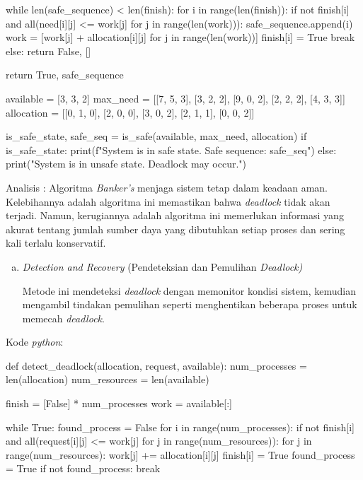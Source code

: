 \documentclass[12pt]{article}
\begin{document}
\begin{enumerate}
\begin{python}
while len(safe_sequence) < len(finish):
    for i in range(len(finish)):
        if not finish[i] and all(need[i][j] <= work[j] for j in range(len(work))):
            safe_sequence.append(i)
            work = [work[j] + allocation[i][j] for j in range(len(work))]
            finish[i] = True
            break
    else:
        return False, []

return True, safe_sequence

available = [3, 3, 2]
max_need = [[7, 5, 3], [3, 2, 2], [9, 0, 2], [2, 2, 2], [4, 3, 3]]
allocation = [[0, 1, 0], [2, 0, 0], [3, 0, 2], [2, 1, 1], [0, 0, 2]]

is_safe_state, safe_seq = is_safe(available, max_need, allocation)
if is_safe_state:
    print(f"System is in safe state. Safe sequence: {safe_seq}")
else:
    print("System is in unsafe state. Deadlock may occur.")
    \end{python}

    Analisis : Algoritma \textit{Banker's} menjaga sistem tetap dalam keadaan aman. Kelebihannya adalah algoritma ini memastikan bahwa \textit{deadlock} tidak akan terjadi. Namun, kerugiannya adalah algoritma ini memerlukan informasi yang akurat tentang jumlah sumber daya yang dibutuhkan setiap proses dan sering kali terlalu konservatif.

    \begin{enumerate}[c.]
        \item \textit{Detection and Recovery} (Pendeteksian dan Pemulihan \textit{Deadlock)}

        Metode ini mendeteksi \textit{deadlock} dengan memonitor kondisi sistem, kemudian mengambil tindakan pemulihan seperti menghentikan beberapa proses untuk memecah \textit{deadlock}.
    \end{enumerate}

    Kode \textit{python}:

    \begin{python}
def detect_deadlock(allocation, request, available):
    num_processes = len(allocation)
    num_resources = len(available)

    finish = [False] * num_processes
    work = available[:]

    while True:
        found_process = False
        for i in range(num_processes):
            if not finish[i] and all(request[i][j] <= work[j] for j in range(num_resources)):
                for j in range(num_resources):
                    work[j] += allocation[i][j]
                finish[i] = True
                found_process = True
        if not found_process:
            break


\end{python}
\end{enumerate}
\end{document}
